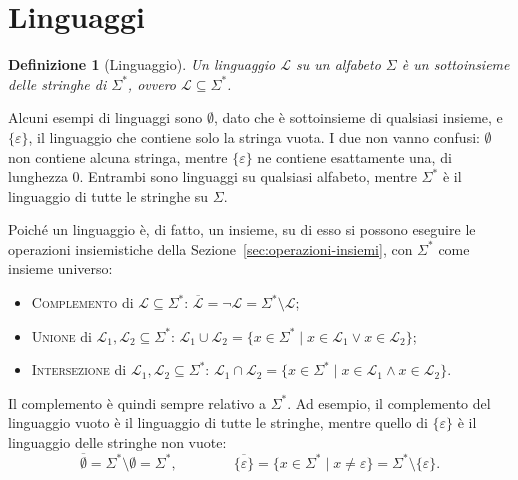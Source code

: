 \documentclass[a4paper, 11pt, oneside]{book}
\theoremstyle{formale}
\newtheorem*{definition}{Definizione}
\begin{document}
    \section{Linguaggi}
    \begin{definition}[Linguaggio]
        Un \emph{linguaggio} $\mathcal{L}$ su un alfabeto $\Sigma$ \`e un sottoinsieme delle
        stringhe di $\Sigma^*$, ovvero $\mathcal{L} \subseteq \Sigma^*$.
    \end{definition}

    Alcuni esempi di linguaggi sono $\emptyset$, dato che \`e sottoinsieme di qualsiasi
    insieme, e $\{\varepsilon\}$, il linguaggio che contiene solo la stringa vuota. I due
    non vanno confusi: $\emptyset$ non contiene alcuna stringa, mentre $\{\varepsilon\}$
    ne contiene esattamente una, di lunghezza $0$. Entrambi sono linguaggi su qualsiasi
    alfabeto, mentre $\Sigma^*$ \`e il linguaggio di tutte le stringhe su $\Sigma$.

    Poich\'e un linguaggio \`e, di fatto, un insieme, su di esso si possono eseguire le
    operazioni insiemistiche della Sezione~\ref{sec:operazioni-insiemi}, con $\Sigma^*$
    come insieme universo:
    \begin{itemize}
        \item \textsc{Complemento} di $\mathcal{L} \subseteq \Sigma^*$:
            $\overline{\mathcal{L}} = \neg \mathcal{L} = \Sigma^* \setminus \mathcal{L}$;
        \item \textsc{Unione} di $\mathcal{L}_1, \mathcal{L}_2 \subseteq \Sigma^*$:
            $\mathcal{L}_1 \cup \mathcal{L}_2 = \{x \in \Sigma^* \mid x \in \mathcal{L}_1
            \lor x \in \mathcal{L}_2\}$;
        \item \textsc{Intersezione} di $\mathcal{L}_1, \mathcal{L}_2 \subseteq \Sigma^*$:
            $\mathcal{L}_1 \cap \mathcal{L}_2 = \{x \in \Sigma^* \mid x \in \mathcal{L}_1
            \land x \in \mathcal{L}_2\}$.
    \end{itemize}
    Il complemento \`e quindi sempre relativo a $\Sigma^*$. Ad esempio, il complemento del
    linguaggio vuoto \`e il linguaggio di tutte le stringhe, mentre quello di
    $\{\varepsilon\}$ \`e il linguaggio delle stringhe non vuote:
    \begin{equation*}
        \overline{\emptyset} = \Sigma^* \setminus \emptyset = \Sigma^*,
        \qquad\qquad
        \overline{\{\varepsilon\}} = \{x \in \Sigma^* \mid x \neq \varepsilon\}
        = \Sigma^* \setminus \{\varepsilon\}.
    \end{equation*}
\end{document}
